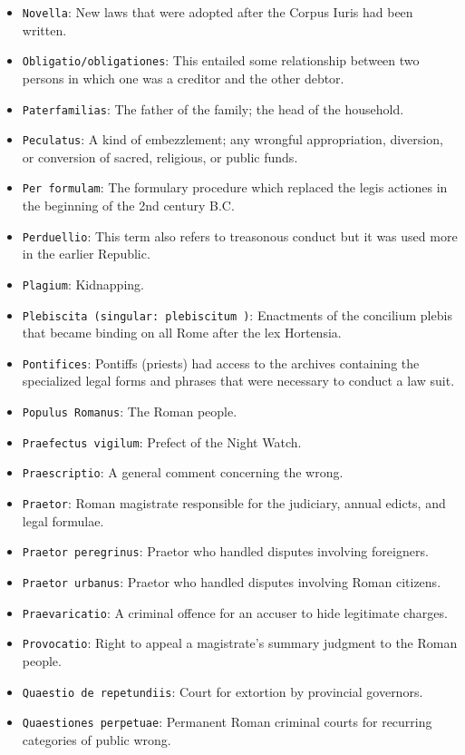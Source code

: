 \documentclass[11pt]{article}
\begin{document}
\begin{itemize}
\item \texttt{Novella}: New laws that were adopted after the Corpus Iuris had been written.
\item \texttt{Obligatio/obligationes}: This entailed some relationship between two persons in which one was a creditor and the other debtor.
\item \texttt{Paterfamilias}: The father of the family; the head of the household.
\item \texttt{Peculatus}: A kind of embezzlement; any wrongful appropriation, diversion, or conversion of sacred, religious, or public funds.
\item \texttt{Per formulam}: The formulary procedure which replaced the legis actiones in the beginning of the 2nd century B.C.
\item \texttt{Perduellio}: This term also refers to treasonous conduct but it was used more in the earlier Republic.
\item \texttt{Plagium}: Kidnapping.
\item \texttt{Plebiscita (singular: plebiscitum )}: Enactments of the concilium plebis that became binding on all Rome after the lex Hortensia.
\item \texttt{Pontifices}: Pontiffs (priests) had access to the archives containing the specialized legal forms and phrases that were necessary to conduct a law suit.
\item \texttt{Populus Romanus}: The Roman people.
\item \texttt{Praefectus vigilum}: Prefect of the Night Watch.
\item \texttt{Praescriptio}: A general comment concerning the wrong.
\item \texttt{Praetor}: Roman magistrate responsible for the judiciary, annual edicts, and legal formulae.
\item \texttt{Praetor peregrinus}: Praetor who handled disputes involving foreigners.
\item \texttt{Praetor urbanus}: Praetor who handled disputes involving Roman citizens.
\item \texttt{Praevaricatio}: A criminal offence for an accuser to hide legitimate charges.
\item \texttt{Provocatio}: Right to appeal a magistrate's summary judgment to the Roman people.
\item \texttt{Quaestio de repetundiis}: Court for extortion by provincial governors.
\item \texttt{Quaestiones perpetuae}: Permanent Roman criminal courts for recurring categories of public wrong.

\end{itemize}
\end{document}
